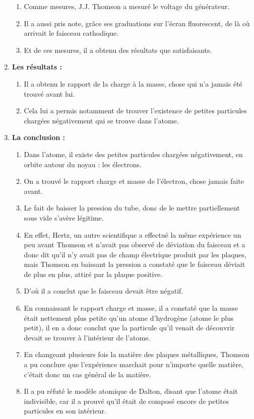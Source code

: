 \documentclass[../main.tex]{subfiles}
\begin{document}
\begin{enumerate}[I]
\begin{enumerate}
        \item Comme mesures, J.J. Thomson a mesuré le voltage du générateur.
        \item Il a aussi pris note, grâce ses graduations sur l'écran fluorescent, de là où arrivait le faisceau cathodique.
        \item Et de ces mesures, il a obtenu des résultats que satisfaisants.
    \end{enumerate}
    \item \textbf {Les résultats :}
    \begin{enumerate}
        \item Il a obtenu le rapport de la charge à la masse, chose qui n'a jamais été trouvé avant lui.
        \item Cela lui a permis notamment de trouver l'existence de petites particules chargées négativement qui se trouve dans l'atome. 
    \end{enumerate}
    \item \textbf {La conclusion :}
    \begin{enumerate}
        \item Dans l'atome, il existe des petites particules chargées négativement, en orbite autour du noyau : les électrons.
        \item On a trouvé le rapport charge et masse de l'électron, chose jamais faite avant.
        \item Le fait de baisser la pression du tube, donc de le mettre partiellement sous vide s'avère légitime.
        \item En effet, Hertz, un autre scientifique a effectué la même expérience un peu avant Thomson et n'avait pas observé de déviation du faisceau et a donc dit qu'il n'y avait pas de champ électrique produit par les plaques, mais Thomson en baissant la pression a constaté que le faisceau déviait de plus en plus, attiré par la plaque positive.
        \item D'où il a conclut que le faisceau devait être négatif.
        \item En connaissant le rapport charge et masse, il a constaté que la masse était nettement plus petite qu'un atome d'hydrogène (atome le plus petit), il en a donc conclut que la particule qu'il venait de découvrir devait se trouver à l'intérieur de l'atome.
        \item En changeant plusieurs fois la matière des plaques métalliques, Thomson a pu conclure que l'expérience marchait pour n'importe quelle matière, c'était donc un cas général de la matière.
        \item Il a pu réfuté le modèle atomique de Dalton, disant que l'atome était indivisible, car il a prouvé qu'il était de composé encore de petites particules en son intérieur.
    \end{enumerate}
\end{enumerate}
\end{document}
